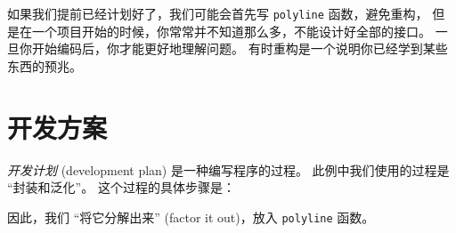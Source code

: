
如果我们提前已经计划好了，我们可能会首先写 \lstinline{polyline} 函数，避免重构，
但是在一个项目开始的时候，你常常并不知道那么多，不能设计好全部的接口。
一旦你开始编码后，你才能更好地理解问题。
有时重构是一个说明你已经学到某些东西的预兆。


\section{开发方案}



\emph{开发计划} (development plan) 是一种编写程序的过程。
此例中我们使用的过程是 ``封装和泛化''。 这个过程的具体步骤是：

因此，我们 ``将它分解出来'' (factor it out)，放入 \lstinline{polyline} 函数。



